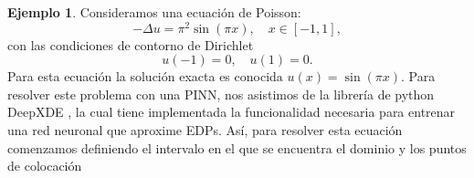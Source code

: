 \documentclass[a4paper,11pt,spanish, twoside, leqno]{tfg-uam}
\theoremstyle{definition}
\newtheorem{exmp}[teor]{Ejemplo}
\begin{document}
\begin{mdframed}
    \begin{exmp}
        Consideramos una ecuación de Poisson:
        \begin{equation*}
        -\Delta u = \pi^2 \sin(\pi x), \quad x \in [-1, 1],
        \end{equation*}
        con las condiciones de contorno de Dirichlet
        \begin{equation*}
        u(-1) = 0, \quad u(1) = 0.
        \end{equation*}
        Para esta ecuación la solución exacta es  conocida $ u(x) = \sin(\pi x)$. Para resolver este problema con una PINN, nos asistimos de la librería de python DeepXDE \cite{lu2021deepxde}, la cual tiene implementada la funcionalidad necesaria para entrenar una red neuronal que aproxime EDPs. Así, para resolver esta ecuación comenzamos definiendo el intervalo en el que se encuentra el dominio y los puntos de colocación
        

\end{exmp}
\end{mdframed}
\end{document}
